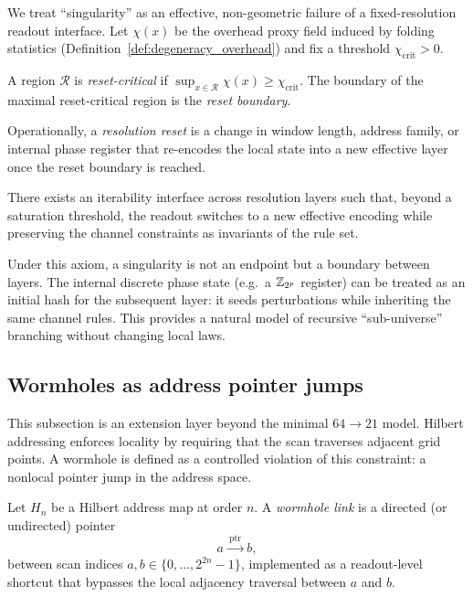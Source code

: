 We treat ``singularity'' as an effective, non-geometric failure of a fixed-resolution readout interface.
Let $\chi(x)$ be the overhead proxy field induced by folding statistics (Definition~\ref{def:degeneracy_overhead}) and fix a threshold $\chi_{\mathrm{crit}}>0$.

\begin{definition}
\label{def:reset_critical}
A region $\mathcal{R}$ is \emph{reset-critical} if $\sup_{x\in\mathcal{R}}\chi(x)\ge \chi_{\mathrm{crit}}$.
The boundary of the maximal reset-critical region is the \emph{reset boundary}.
\end{definition}

Operationally, a \emph{resolution reset} is a change in window length, address family, or internal phase register that re-encodes the local state into a new effective layer once the reset boundary is reached.

\begin{axiom}
\label{ax:recursive_reset}
There exists an iterability interface across resolution layers such that, beyond a saturation threshold, the readout switches to a new effective encoding while preserving the channel constraints as invariants of the rule set.
\end{axiom}

Under this axiom, a singularity is not an endpoint but a boundary between layers.
The internal discrete phase state (e.g.\ a $\mathbb{Z}_{2^p}$ register) can be treated as an initial hash for the subsequent layer: it seeds perturbations while inheriting the same channel rules.
This provides a natural model of recursive ``sub-universe'' branching without changing local laws.

\subsection{Wormholes as address pointer jumps}
\label{subsec:wormholes_pointer}

This subsection is an extension layer beyond the minimal $64\to 21$ model.
Hilbert addressing enforces locality by requiring that the scan traverses adjacent grid points.
A wormhole is defined as a controlled violation of this constraint: a nonlocal pointer jump in the address space.

\begin{definition}
\label{def:wormhole_pointer_jump}
Let $H_n$ be a Hilbert address map at order $n$.
A \emph{wormhole link} is a directed (or undirected) pointer
\[
a \xrightarrow{\ \mathrm{ptr}\ } b,
\]
between scan indices $a,b\in\{0,\dots,2^{2n}-1\}$, implemented as a readout-level shortcut that bypasses the local adjacency traversal between $a$ and $b$.
\end{definition}

